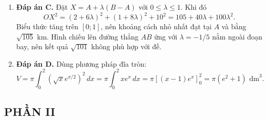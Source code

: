 \documentclass[12pt,a4paper]{article}
\begin{document}
\begin{enumerate}[label=\textbf{Câu \arabic*:}, leftmargin=*]
\item \textbf{Đáp án C.} Đặt $X=A+\lambda(B-A)$ với $0\le\lambda\le1$. Khi đó
\[
OX^2=(2+6\lambda)^2+(1+8\lambda)^2+10^2
 =105+40\lambda+100\lambda^2.
\]
Biểu thức tăng trên $[0;1]$, nên khoảng cách nhỏ nhất đạt tại $A$ và bằng $\sqrt{105}$ km. Hình chiếu lên đường thẳng $AB$ ứng với $\lambda=-1/5$ nằm ngoài đoạn bay, nên kết quả $\sqrt{101}$ không phù hợp với đề.
\item \textbf{Đáp án D.} Dùng phương pháp đĩa tròn:
\[
V=\pi\int_0^2(\sqrt{x}e^{x/2})^2\,dx
 =\pi\int_0^2xe^x\,dx=\pi[(x-1)e^x]_0^2=\pi(e^2+1)\text{ dm}^3.
\]
\end{enumerate}

\subsection*{PHẦN II}
\end{document}
